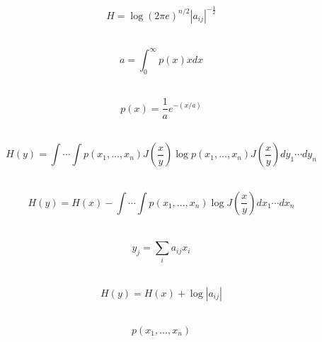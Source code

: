 \\

\begin{equation}
H=\log \left ( 2\pi e \right )^{n/2}\left | a_{ij} \right |^{-\frac{1}{2}}
\end{equation}

\\

\begin{equation}
a=\int_{0}^{\infty}p\left ( x \right )xdx
\end{equation}

\\

\begin{equation}
p\left ( x \right )=\frac{1}{a}e^{-\left ( x/a \right )}
\end{equation}

\\

\begin{equation}
H\left ( y \right )=\int \cdots \int p\left ( x_{1},...,x_{n} \right )J\left ( \frac{x}{y} \right )\log p\left ( x_{1},...,x_{n} \right )J\left ( \frac{x}{y} \right )dy_{1}\cdots dy_{n}
\end{equation}

\\

\begin{equation}
H\left ( y \right )=H\left ( x \right )-\int \cdots \int p\left ( x_{1},...,x_{n} \right )\log J \left ( \frac{x}{y} \right )dx_{1}\cdots dx_{n}
\end{equation}

\\

\begin{equation}
y_{j}=\sum_{i}^{\:}a_{ij}x_{i}
\end{equation}

\\

\begin{equation}
H\left ( y \right )=H\left ( x \right )+\log\left | a_{ij} \right |
\end{equation}

\\

\begin{equation}
p\left ( x_{1},...,x_{n}\right )
\end{equation}

\\


